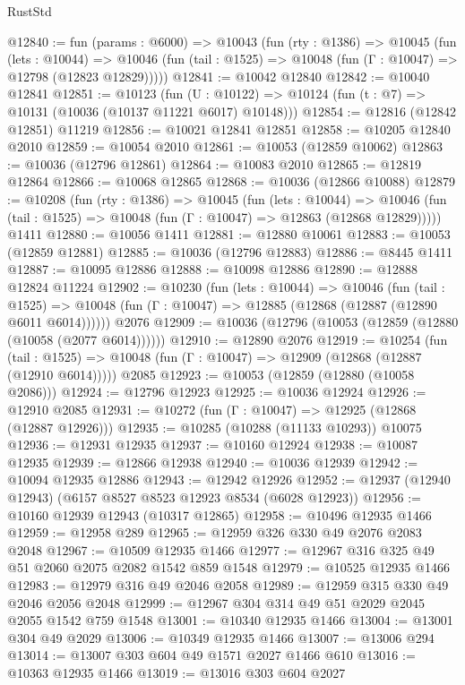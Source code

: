 \begin{lexlean}{RustStd}
\begin{coremodule}
{{@12840 := fun (params : @6000) =>
  @10043
    (fun (rty : @1386) =>
    @10045
      (fun (lets : @10044) =>
      @10046 (fun (tail : @1525) => @10048 (fun (Γ : @10047) => @12798 (@12823 @12829)))))
@12841 := @10042 @12840
@12842 := @10040 @12841
@12851 := @10123
    (fun (U : @10122) => @10124 (fun (t : @7) => @10131 (@10036 (@10137 @11221 @6017) @10148)))
@12854 := @12816 (@12842 @12851) @11219
@12856 := @10021 @12841 @12851
@12858 := @10205 @12840 @2010
@12859 := @10054 @2010
@12861 := @10053 (@12859 @10062)
@12863 := @10036 (@12796 @12861)
@12864 := @10083 @2010
@12865 := @12819 @12864
@12866 := @10068 @12865
@12868 := @10036 (@12866 @10088)
@12879 := @10208
    (fun (rty : @1386) =>
    @10045
      (fun (lets : @10044) =>
      @10046 (fun (tail : @1525) => @10048 (fun (Γ : @10047) => @12863 (@12868 @12829)))))
    @1411
@12880 := @10056 @1411
@12881 := @12880 @10061
@12883 := @10053 (@12859 @12881)
@12885 := @10036 (@12796 @12883)
@12886 := @8445 @1411
@12887 := @10095 @12886
@12888 := @10098 @12886
@12890 := @12888 @12824 @11224
@12902 := @10230
    (fun (lets : @10044) =>
    @10046
      (fun (tail : @1525) =>
      @10048 (fun (Γ : @10047) => @12885 (@12868 (@12887 (@12890 @6011 @6014))))))
    @2076
@12909 := @10036 (@12796 (@10053 (@12859 (@12880 (@10058 (@2077 @6014))))))
@12910 := @12890 @2076
@12919 := @10254
    (fun (tail : @1525) => @10048 (fun (Γ : @10047) => @12909 (@12868 (@12887 (@12910 @6014)))))
    @2085
@12923 := @10053 (@12859 (@12880 (@10058 @2086)))
@12924 := @12796 @12923
@12925 := @10036 @12924
@12926 := @12910 @2085
@12931 := @10272 (fun (Γ : @10047) => @12925 (@12868 (@12887 @12926)))
@12935 := @10285 (@10288 (@11133 @10293)) @10075
@12936 := @12931 @12935
@12937 := @10160 @12924
@12938 := @10087 @12935
@12939 := @12866 @12938
@12940 := @10036 @12939
@12942 := @10094 @12935 @12886
@12943 := @12942 @12926
@12952 := @12937 (@12940 @12943) (@6157 @8527 @8523 @12923 @8534 (@6028 @12923))
@12956 := @10160 @12939 @12943 (@10317 @12865)
@12958 := @10496 @12935 @1466
@12959 := @12958 @289
@12965 := @12959 @326 @330 @49 @2076 @2083 @2048
@12967 := @10509 @12935 @1466
@12977 := @12967 @316 @325 @49 @51 @2060 @2075 @2082 @1542 @859 @1548
@12979 := @10525 @12935 @1466
@12983 := @12979 @316 @49 @2046 @2058
@12989 := @12959 @315 @330 @49 @2046 @2056 @2048
@12999 := @12967 @304 @314 @49 @51 @2029 @2045 @2055 @1542 @759 @1548
@13001 := @10340 @12935 @1466
@13004 := @13001 @304 @49 @2029
@13006 := @10349 @12935 @1466
@13007 := @13006 @294
@13014 := @13007 @303 @604 @49 @1571 @2027 @1466 @610
@13016 := @10363 @12935 @1466
@13019 := @13016 @303 @604 @2027
}}
\end{coremodule}
\end{lexlean}
